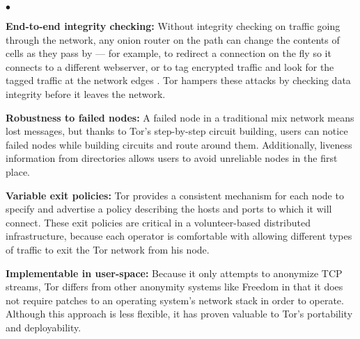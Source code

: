\documentclass[times,10pt,twocolumn]{article}
\newenvironment{tightlist}{\begin{list}{$\bullet$}{
  \setlength{\itemsep}{0mm}
    \setlength{\parsep}{0mm}
    }}{\end{list}}
\begin{document}
\begin{tightlist}
\item \textbf{End-to-end integrity checking:} Without integrity checking
on traffic going through the network, any onion router on the path
can change the contents of cells as they pass by --- for example, to redirect a
connection on the fly so it connects to a different webserver, or to
tag encrypted traffic and look for the tagged traffic at the network
edges \cite{minion-design}.  Tor hampers these attacks by checking data
integrity before it leaves the network.

\item \textbf{Robustness to failed nodes:} A failed node in a traditional
mix network means lost messages, but thanks to Tor's step-by-step
circuit building, users can notice failed
nodes while building circuits and route around them.  Additionally,
liveness information from directories allows users to avoid
unreliable nodes in the first place.
%

\item \textbf{Variable exit policies:} Tor provides a consistent
mechanism for
each node to specify and advertise a policy describing the hosts and
ports to which it will connect. These exit policies
are critical in a volunteer-based distributed infrastructure, because
each operator is comfortable with allowing different types of traffic
to exit the Tor network from his node.

\item \textbf{Implementable in user-space:} Because it only attempts to
anonymize TCP streams, Tor differs from other anonymity systems like
Freedom \cite{freedom} in that it does not require patches to an operating
system's network stack in order to operate.  Although this approach is less
flexible, it has proven valuable to Tor's portability and deployability.


\end{tightlist}
\end{document}
